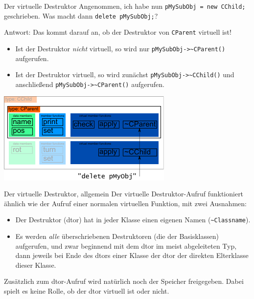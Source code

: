 \begin{frame}[fragile,b]{Der virtuelle Destruktor}
	Angenommen, ich habe nun \verb|pMySubObj = new CChild;| geschrieben. Was macht dann \verb|delete pMySubObj;|?
	
	\pause
	\vspace{1em}
	
	Antwort: Das kommt darauf an, ob der Destruktor von \verb|CParent| virtuell ist!
	\begin{itemize}
		\item Ist der Destruktor \emph{nicht} virtuell, so wird nur \verb|pMySubObj->~CParent()| aufgerufen.
		\item Ist der Destruktor virtuell, so wird zunächst \verb|pMySubObj->~CChild()| und anschließend \verb|pMySubObj->~CParent()| aufgerufen.
	\end{itemize}
	
	\includegraphics[width=0.5\linewidth]{images/pMySubObj-dtor}
\end{frame}

\begin{frame}[fragile]{Der virtuelle Destruktor, allgemein}
	Der virtuelle Destruktor-Aufruf funktioniert ähnlich wie der Aufruf einer normalen virtuellen Funktion, mit zwei Ausnahmen:
	
	\begin{itemize}
		\item Der Destruktor (dtor) hat in jeder Klasse einen eigenen Namen (\verb|~Classname|).
		\item Es werden \emph{alle} überschriebenen Destruktoren (die der Basisklassen) aufgerufen, und zwar beginnend mit dem dtor im meist abgeleiteten Typ, dann jeweils bei Ende des dtors einer Klasse der dtor der direkten Elterklasse dieser Klasse.
	\end{itemize}
	
	\pause
	\vspace{1em}
	
	Zusätzlich zum dtor-Aufruf wird natürlich noch der Speicher freigegeben. Dabei spielt es keine Rolle, ob der dtor virtuell ist oder nicht.
\end{frame}

